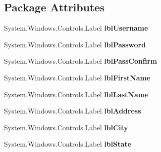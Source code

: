 \subsection*{Package Attributes}
\begin{DoxyCompactItemize}
\item 
System.\+Windows.\+Controls.\+Label {\bfseries lbl\+Username}\hypertarget{class_p_c_builder_forms_1_1_log_in_ab7bcba65c47e51c34858cce414f2decd}{}\label{class_p_c_builder_forms_1_1_log_in_ab7bcba65c47e51c34858cce414f2decd}

\item 
System.\+Windows.\+Controls.\+Label {\bfseries lbl\+Password}\hypertarget{class_p_c_builder_forms_1_1_log_in_af3bf711dc3b2e7afdcf0b47d5c097416}{}\label{class_p_c_builder_forms_1_1_log_in_af3bf711dc3b2e7afdcf0b47d5c097416}

\item 
System.\+Windows.\+Controls.\+Label {\bfseries lbl\+Pass\+Confirm}\hypertarget{class_p_c_builder_forms_1_1_log_in_a18403b2be197f23358cf073b10360a07}{}\label{class_p_c_builder_forms_1_1_log_in_a18403b2be197f23358cf073b10360a07}

\item 
System.\+Windows.\+Controls.\+Label {\bfseries lbl\+First\+Name}\hypertarget{class_p_c_builder_forms_1_1_log_in_a2cee60babe4afc16f12049c744f9158a}{}\label{class_p_c_builder_forms_1_1_log_in_a2cee60babe4afc16f12049c744f9158a}

\item 
System.\+Windows.\+Controls.\+Label {\bfseries lbl\+Last\+Name}\hypertarget{class_p_c_builder_forms_1_1_log_in_a387bedcbb2e3e91e52f1c7d439fdc4a5}{}\label{class_p_c_builder_forms_1_1_log_in_a387bedcbb2e3e91e52f1c7d439fdc4a5}

\item 
System.\+Windows.\+Controls.\+Label {\bfseries lbl\+Address}\hypertarget{class_p_c_builder_forms_1_1_log_in_a38bc4cccf50c7d73b71e1061a8b6f918}{}\label{class_p_c_builder_forms_1_1_log_in_a38bc4cccf50c7d73b71e1061a8b6f918}

\item 
System.\+Windows.\+Controls.\+Label {\bfseries lbl\+City}\hypertarget{class_p_c_builder_forms_1_1_log_in_a892e206664f293f6fd7e58487b7e0ab7}{}\label{class_p_c_builder_forms_1_1_log_in_a892e206664f293f6fd7e58487b7e0ab7}

\item 
System.\+Windows.\+Controls.\+Label {\bfseries lbl\+State}\hypertarget{class_p_c_builder_forms_1_1_log_in_a7602a0f2fbd4d339609b3ed43bf1cab0}{}\label{class_p_c_builder_forms_1_1_log_in_a7602a0f2fbd4d339609b3ed43bf1cab0}


\end{DoxyCompactItemize}

